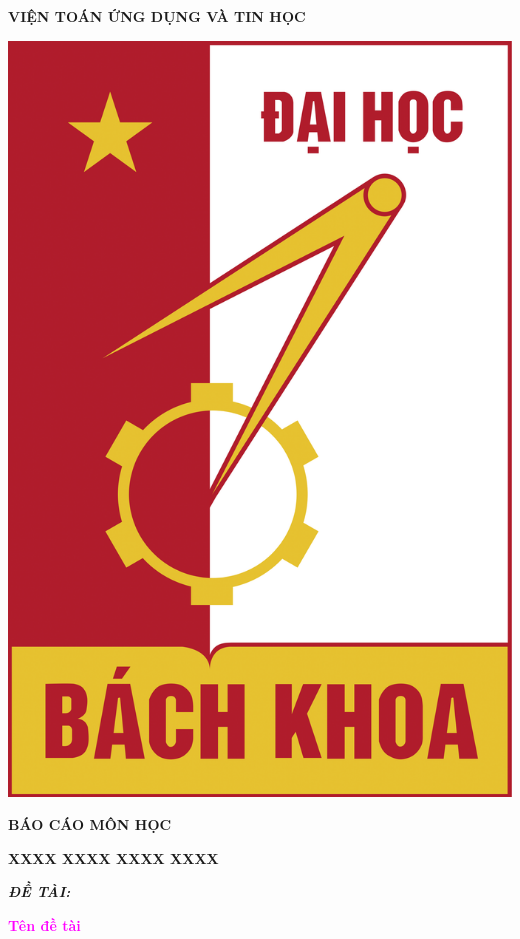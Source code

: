 \begin{titlepage}
\begin{minipage}{0.8\textwidth}
\begin{center}
    \vspace{7pt}
    \textbf{VIỆN TOÁN ỨNG DỤNG VÀ TIN HỌC}
\end{center}
\vspace{30pt}
\begin{center}
    \includegraphics[scale=0.2]{rpt-img/LOGO_HUST.png}
    
    \vspace{40pt}
    \fontsize{18pt}{17pt}\selectfont 
    \textbf{BÁO CÁO MÔN HỌC} 
    
    \vspace{7pt}
    \textbf{XXXX XXXX XXXX XXXX}
\end{center}
\begin{flushleft}
    \fontsize{14pt}{18pt}\selectfont  
    \textbf{\textsl{ĐỀ TÀI:}}
\end{flushleft}
\begin{center}
    \fontsize{25pt}{25pt}\selectfont 
    \textcolor{magenta}{\sffamily \textbf{\bf\Large Tên đề tài}}\\
\end{center}


\end{minipage}
\end{titlepage}

